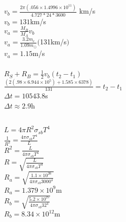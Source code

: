 \documentclass{article}
\begin{document}
\subsubsection{}
\begin{center}
\(v_b = \frac{2\pi (.056 \times 1.4996 \times 10^{11})}{4.727 * 24 * 3600}\) km/s \\

\(v_b = 131\)km/s \\
\vspace{6mm}
\(v_a = \frac{M_B}{M_A}v_b\)\\
\(v_a = \frac{3.2m_e}{1.09m_\odot}(\)131km/s\()\)\\
\(v_a = 1.15\)m/s \\
\end{center}

\subsubsection{}

\begin{center}
    \(R_S + R_B = \frac{1}{2} v_b(t_2 - t_1)\)\\
    \(\frac{(2(.98 \times 6.944 \times 10^5) +  1.585 \times 6378) }{131} = t_2 - t_1 \)\\
    \(\Delta t = 10543.8\)s\\
    \(\Delta t \approx 2.9\)h
    
\end{center}

\begin{center}
    
\end{center}

\subsection{}
\subsubsection{}
\begin{center}
    \(L = 4\pi R^2\sigma_{sb} T^4\)\\
    \(\frac{1}{R^2} = \frac{4\pi\sigma_{sb} T^4}{L}\) \\
    \({R^2} = \frac{L}{4\pi\sigma_{sb} T^4}\)\\
    \({R} = \sqrt{\frac{L}{4\pi\sigma_{sb} T^4}}\)
    \vspace{5mm} \\
    \(R_a = \sqrt{\frac{1.1 \times 10^{26}}{4\pi \sigma_{sb} 3000^4}}\)\\
    \(R_a = 1.379 \times 10^{9}\)m\\
    \vspace{5mm}
    \(R_b = \sqrt{\frac{5.2 \times 10^{25}}{4\pi \sigma_{sb} 32^4}}\)\\
    \(R_b = 8.34 \times 10^{12}\)m
    \end{center}
\end{document}

